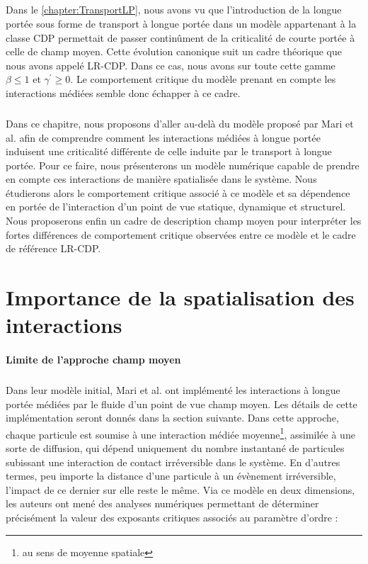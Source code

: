 \subparagraph{}Dans le \autoref{chapter:TransportLP}, nous avons vu que l'introduction de la longue portée sous forme de transport à longue portée dans un modèle appartenant à la classe CDP permettait de passer continûment de la criticalité de courte portée à celle de champ moyen. Cette évolution canonique suit un cadre théorique que nous avons appelé LR-CDP. Dans ce cas, nous avons sur toute cette gamme $\beta \leq 1$ et $\gamma^\prime \geq 0$. Le comportement critique du modèle prenant en compte les interactions médiées semble donc échapper à ce cadre.

\subparagraph{}Dans ce chapitre, nous proposons d'aller au-delà du modèle proposé par Mari et al. \cite{mari_absorbing_2022} afin de comprendre comment les interactions médiées à longue portée induisent une criticalité différente de celle induite par le transport à longue portée. Pour ce faire, nous présenterons un modèle numérique capable de prendre en compte ces interactions de manière spatialisée dans le système. Nous étudierons alors le comportement critique associé à ce modèle et sa dépendence en portée de l'interaction d'un point de vue statique, dynamique et structurel. Nous proposerons enfin un cadre de description champ moyen pour interpréter les fortes différences de comportement critique observées entre ce modèle et le cadre de référence LR-CDP.

\section{Importance de la spatialisation des interactions}

\paragraph{Limite de l'approche champ moyen}

\subparagraph{}Dans leur modèle initial, Mari et al. \cite{mari_absorbing_2022} ont implémenté les interactions à longue portée médiées par le fluide d'un point de vue champ moyen. Les détails de cette implémentation seront donnés dans la section suivante. Dans cette approche, chaque particule est soumise à une interaction médiée moyenne\footnote{au sens de moyenne spatiale}, assimilée à une sorte de diffusion, qui dépend uniquement du nombre instantané de particules subissant une interaction de contact irréversible dans le système. En d'autres termes, peu importe la distance d'une particule à un évènement irréversible, l'impact de ce dernier sur elle reste le même. Via ce modèle en deux dimensions, les auteurs ont mené des analyses numériques permettant de déterminer précisément la valeur des exposants critiques associés au paramètre d'ordre :

